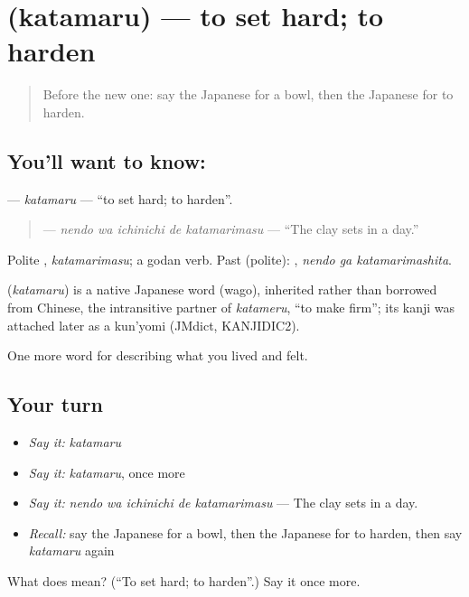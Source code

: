 \section[\texorpdfstring{\ja{かたまる} (katamaru)}{かたまる (katamaru)}]{ (katamaru) — to set hard; to harden}

\label{lesson:JA-C483-katamaru}



\begin{quote}
Before the new one: say the Japanese for a bowl, then the Japanese for to harden.
\end{quote}

\subsection*{You'll want to know: }
\textbf{} — \emph{katamaru} — \textquotedblleft{}to set hard; to harden\textquotedblright{}.

\begin{quote}
\textbf{  } — \emph{nendo wa ichinichi de katamarimasu} — \textquotedblleft{}The clay sets in a day.\textquotedblright{}
\end{quote}

Polite \textbf{}, \emph{katamarimasu}; a godan verb. Past (polite): \textbf{ }, \emph{nendo ga katamarimashita}.

\begin{cousinweb}
\textbf{} (\emph{katamaru}) is a native Japanese word (wago), inherited rather than borrowed from Chinese, the intransitive partner of \emph{katameru}, \textquotedblleft{}to make firm\textquotedblright{}; its kanji was attached later as a kun'yomi (JMdict, KANJIDIC2).
\end{cousinweb}

\begin{grammarlens}[title={What you've built}]
One more word for describing what you lived and felt.
\end{grammarlens}

\subsection*{Your turn}
\begin{itemize}
\raggedright
  \item \emph{Say it:} \emph{katamaru}
  \item \emph{Say it:} \emph{katamaru}, once more
  \item \emph{Say it:} \emph{nendo wa ichinichi de katamarimasu} — The clay sets in a day.
  \item \emph{Recall:} say the Japanese for a bowl, then the Japanese for to harden, then say \emph{katamaru} again
\end{itemize}

\begin{tcolorbox}[breakable,colback=teal!4,colframe=teal!35!black,title={Before you move on}]
What does  mean? (\textquotedblleft{}To set hard; to harden\textquotedblright{}.) Say it once more.
\end{tcolorbox}
